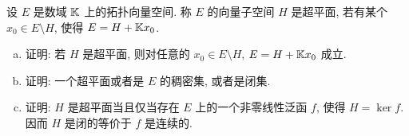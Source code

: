 

\begin{exercise}
  设 $E$ 是数域 $\mathbb{K}$ 上的拓扑向量空间. 称 $E$ 的向量子空间 $H$ 是超平面,
  若有某个 $x_0\in E\setminus H$, 使得 $E = H + \mathbb{K} x_0$.
  \begin{enumerate}[(a)]
    \item 证明: 若 $H$ 是超平面, 则对任意的 $x_0\in E\setminus H$, $E=H+\mathbb{K} x_0$ 成立.
    \item 证明: 一个超平面或者是 $E$ 的稠密集, 或者是闭集.
    \item 证明: $H$ 是超平面当且仅当存在 $E$ 上的一个非零线性泛函 $f$, 使得 $H=\ker f$.
      因而 $H$ 是闭的等价于 $f$ 是连续的.
  \end{enumerate}
\end{exercise}

